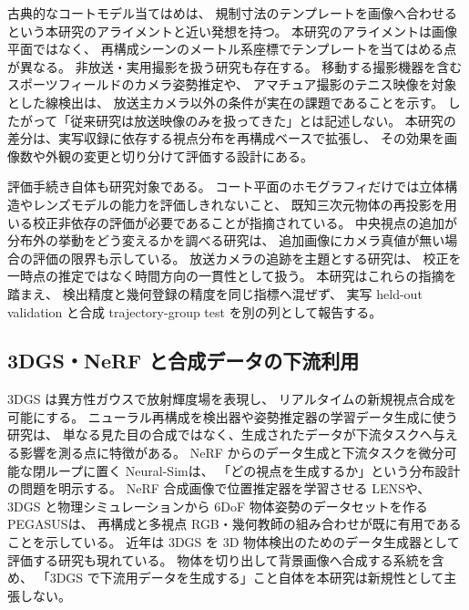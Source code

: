 古典的なコートモデル当てはめ\cite{farin2004courtmodels}は、
規制寸法のテンプレートを画像へ合わせるという本研究のアライメントと近い発想を持つ。
本研究のアライメントは画像平面ではなく、
再構成シーンのメートル系座標でテンプレートを当てはめる点が異なる。
非放送・実用撮影を扱う研究も存在する。
移動する撮影機器を含むスポーツフィールドのカメラ姿勢推定\cite{citraro2020realtime}や、
アマチュア撮影のテニス映像を対象とした線検出\cite{agrawal2024amateur}は、
放送主カメラ以外の条件が実在の課題であることを示す。
したがって「従来研究は放送映像のみを扱ってきた」とは記述しない。
本研究の差分は、実写収録に依存する視点分布を再構成ベースで拡張し、
その効果を画像数や外観の変更と切り分けて評価する設計にある。

評価手続き自体も研究対象である。
コート平面のホモグラフィだけでは立体構造やレンズモデルの能力を評価しきれないこと、
既知三次元物体の再投影を用いる校正非依存の評価が必要であることが指摘されている\cite{magera2024procc}。
中央視点の追加が分布外の挙動をどう変えるかを調べる研究\cite{magera2025centralviews}は、
追加画像にカメラ真値が無い場合の評価の限界も示している。
放送カメラの追跡を主題とする研究\cite{magera2025broadtrack}は、
校正を一時点の推定ではなく時間方向の一貫性として扱う。
本研究はこれらの指摘を踏まえ、
検出精度と幾何登録の精度を同じ指標へ混ぜず、
実写 held-out validation と合成 trajectory-group test を別の列として報告する。

\subsection{3DGS・NeRF と合成データの下流利用}

3DGS は異方性ガウスで放射輝度場を表現し、
リアルタイムの新規視点合成を可能にする\cite{kerbl2023gaussian}。
ニューラル再構成を検出器や姿勢推定器の学習データ生成に使う研究は、
単なる見た目の合成ではなく、生成されたデータが下流タスクへ与える影響を測る点に特徴がある。
NeRF からのデータ生成と下流タスクを微分可能な閉ループに置く Neural-Sim\cite{ge2022neuralsim}は、
「どの視点を生成するか」という分布設計の問題を明示する。
NeRF 合成画像で位置推定器を学習させる LENS\cite{moreau2021lens}や、
3DGS と物理シミュレーションから 6DoF 物体姿勢のデータセットを作る PEGASUS\cite{meyer2024pegasus}は、
再構成と多視点 RGB・幾何教師の組み合わせが既に有用であることを示している。
近年は 3DGS を 3D 物体検出のためのデータ生成器として評価する研究も現れている\cite{zanjani2025gsgenerator}。
物体を切り出して背景画像へ合成する系統\cite{vanherle2025cutandsplat}を含め、
「3DGS で下流用データを生成する」こと自体を本研究は新規性として主張しない。

